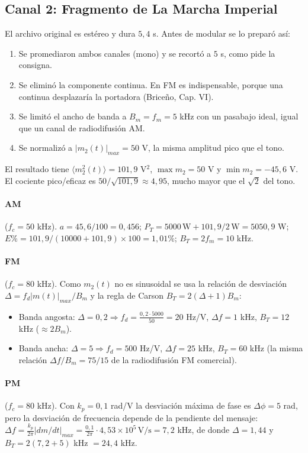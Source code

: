 \documentclass[11pt,a4paper]{article}
\numberwithin{equation}{section}
\begin{document}
\subsection{Canal 2: Fragmento de La Marcha Imperial}
El archivo original es estéreo y dura $5,4$ s. Antes de modular se lo preparó así:
\begin{enumerate}
  \item Se promediaron ambos canales (mono) y se recortó a $5$ s, como pide la consigna.
  \item Se eliminó la componente continua. En FM es indispensable, porque una continua desplazaría la portadora (Briceño, Cap. VI).
  \item Se limitó el ancho de banda a $B_m=f_m=5$ kHz con un pasabajo ideal, igual que un canal de radiodifusión AM.
  \item Se normalizó a $\lvert m_2(t)\rvert_{max}=50$ V, la misma amplitud pico que el tono.
\end{enumerate}
El resultado tiene $\langle m_2^2(t)\rangle =101,9$ V$^2$, $\max m_2=50$ V y $\min m_2=-45,6$ V. El cociente pico/eficaz es $50/\sqrt{101,9}\approx 4,95$, mucho mayor que el $\sqrt{2}$ del tono.

\paragraph{AM} ($f_c=50$ kHz). $a=45,6/100=0,456$; $P_T=5000\,\mathrm{W}+101,9/2\,\mathrm{W}=5050,9$ W; $E\%=101,9/(10000+101,9)\times 100=1,01\%$; $B_T=2f_m=10$ kHz.

\paragraph{FM} ($f_c=80$ kHz). Como $m_2(t)$ no es sinusoidal se usa la relación de desviación $\Delta=f_d\lvert m(t)\rvert_{max}/B_m$ y la regla de Carson $B_T=2(\Delta+1)B_m$:
\begin{itemize}
  \item Banda angosta: $\Delta=0,2 \Rightarrow f_d=\frac{0,2\cdot 5000}{50}=20$ Hz/V, $\Delta f=1$ kHz, $B_T=12$ kHz ($\approx 2B_m$).
  \item Banda ancha: $\Delta=5 \Rightarrow f_d=500$ Hz/V, $\Delta f=25$ kHz, $B_T=60$ kHz (la misma relación $\Delta f/B_m=75/15$ de la radiodifusión FM comercial).
\end{itemize}

\paragraph{PM} ($f_c=80$ kHz). Con $k_p=0,1$ rad/V la desviación máxima de fase es $\Delta\phi=5$ rad, pero la desviación de frecuencia depende de la pendiente del mensaje: $\Delta f=\frac{k_p}{2\pi}\lvert dm/dt\rvert_{max}=\frac{0,1}{2\pi}\cdot 4,53\times 10^5\,\mathrm{V/s}=7,2$ kHz, de donde $\Delta=1,44$ y $B_T=2(7,2+5)$ kHz $=24,4$ kHz.
\end{document}
